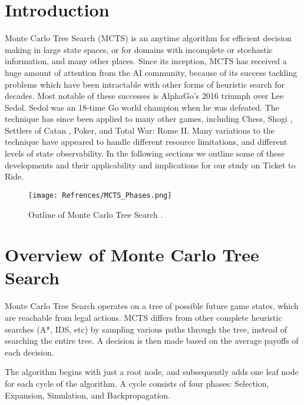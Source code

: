 \documentclass[11pt, letterpaper, twoside]{article}
\begin{document}
\maketitle

\section{Introduction}

Monte Carlo Tree Search (MCTS) \cite{mcts_inaugural} is an anytime algorithm for efficient decision making in large state spaces, or for domains with incomplete or stochastic information, and many other places. Since its inception, MCTS has received a huge amount of attention from the AI community, because of its success tackling problems which have been intractable with other forms of heuristic search for decades. Most notable of these successes is AlphaGo's \cite{alphago} 2016 triumph over Lee Sedol. Sedol was an 18-time Go world champion when he was defeated. The technique has since been applied to many other games, including Chess, Shogi \cite{chess_shogi_self_play}, Settlers of Catan \cite{mcts_settlers}, Poker, and Total War: Rome II. Many variations to the technique have appeared to handle different resource limitations, and different levels of state observability. In the following sections we outline some of these developments and their applicability and implications for our study on Ticket to Ride.

\begin{figure}
  \texttt{[image: Refrences/MCTS\_Phases.png]}
  \caption{Outline of Monte Carlo Tree Search \cite{mcts_survey}.}
  \label{fig:mcts_outline}
\end{figure}

\section{Overview of Monte Carlo Tree Search}

Monte Carlo Tree Search operates on a tree of possible future game states, which are reachable from legal actions. MCTS differs from other complete heuristic searches (A*, IDS, etc) by sampling various paths through the tree, instead of searching the entire tree. A decision is then made based on the average payoffs of each decision.
 
The algorithm \cite{mcts_inaugural} begins with just a root node, and subsequently adds one leaf node for each cycle of the algorithm. A cycle consists of four phases: Selection, Expansion, Simulation, and Backpropagation.
\end{document}
